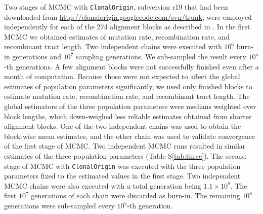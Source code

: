 \documentclass[english]{article}
\begin{document}
Two stages of MCMC with \texttt{ClonalOrigin}, subversion r19 that had been
downloaded from \url{http://clonalorigin.googlecode.com/svn/trunk}, were
employed independently for each of the 274 alignment blocks as described in
\citet{Didelot2010}.   In the first MCMC we obtained estimates of mutation rate,
recombination rate, and recombinant tract length.  Two independent chains were
executed with $10^6$ burn-in generations and $10^7$ sampling generations. We
sub-sampled the result every $10^5$-th generations.  A few alignment blocks were
not successfully finished even after a month of computation.  Because those were
not expected to affect the global estimates of population parameters
significantly, we used only finished blocks to estimate mutation rate,
recombination rate, and recombinant tract length.  The global estimators of the
three population parameters were medians weighted over block lengths, which
down-weighed less reliable estimates obtained from shorter alignment blocks.
One of the two independent chains was used to obtain the block-wise mean
estimates, and the other chain was used to validate convergence of the first
stage of MCMC.  Two independent MCMC runs resulted in similar estimates of the
three population parameters (Table S\ref{tab:three}).  The second stage of MCMC
with \texttt{ClonalOrigin} was executed with the three population parameters
fixed to the estimated values in the first stage.  Two independent MCMC chains
were also executed with a total generation being $1.1\times10^8$. The first
$10^7$ generations of each chain were discarded as burn-in. The remaining $10^8$
generations were sub-sampled every $10^5$-th generation.  
\end{document}
